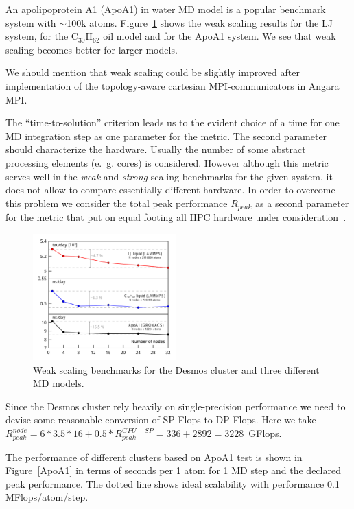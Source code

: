 \documentclass{llncs}
\begin{document}
An apolipoprotein A1 (ApoA1) in water MD model is a popular benchmark system with $\sim$100k atoms. Figure~\ref{weak_scaling} shows the weak scaling results for the LJ system, for the C$_{30}$H$_{62}$ oil model and for the ApoA1 system. We see that weak scaling becomes better for larger models.

We should mention that weak scaling could be slightly improved after implementation of the topology-aware cartesian MPI-communicators in Angara MPI. 

The ``time-to-solution'' criterion leads us to the evident choice of a time for one MD integration step as one parameter for the metric. The second parameter should characterize the hardware. Usually the number of some abstract processing elements (e.~g. cores) is considered. However although this metric serves well in the \emph{weak} and \emph{strong} scaling benchmarks for the given system, it does not allow to compare essentially different hardware. In order to overcome this problem we consider the total peak performance $R_{peak}$ as a second parameter for the metric that put on equal footing all HPC hardware under consideration~\cite{StegailovOrekhovSmirnov-PaCT2015}.

\begin{figure}
\includegraphics[width=5.5cm]{img/weak_scaling.pdf}
\caption{\label{weak_scaling} Weak scaling benchmarks for the Desmos cluster and three different MD models.}
\end{figure}

Since the Desmos cluster rely heavily on single-precision performance we need to devise some reasonable conversion of SP Flops to DP Flops. Here we take $R^{node}_{peak} = 6 * 3.5 * 16 + 0.5 * R^{GPU-SP}_{peak} = 336 + 2892 = 3228$~GFlops. 

The performance of different clusters based on ApoA1 test is shown in Figure~\ref{ApoA1} in terms of seconds per 1 atom for 1 MD step and the declared peak performance. The dotted line shows ideal scalability with performance 0.1 MFlops/atom/step.
\end{document}
